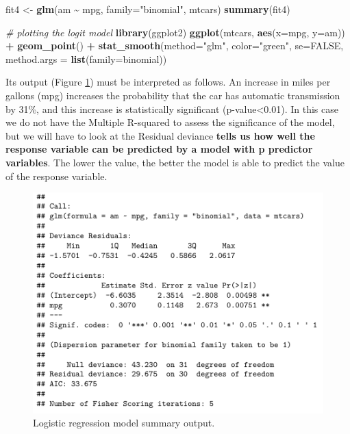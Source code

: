 \documentclass[
]{svmono}
\newenvironment{Shaded}{\begin{snugshade}}{\end{snugshade}}
\newcommand{\AttributeTok}[1]{\textcolor[rgb]{0.13,0.29,0.53}{#1}}
\newcommand{\CommentTok}[1]{\textcolor[rgb]{0.56,0.35,0.01}{\textit{#1}}}
\newcommand{\ConstantTok}[1]{\textcolor[rgb]{0.56,0.35,0.01}{#1}}
\newcommand{\FunctionTok}[1]{\textcolor[rgb]{0.13,0.29,0.53}{\textbf{#1}}}
\newcommand{\NormalTok}[1]{#1}
\newcommand{\OtherTok}[1]{\textcolor[rgb]{0.56,0.35,0.01}{#1}}
\newcommand{\SpecialCharTok}[1]{\textcolor[rgb]{0.81,0.36,0.00}{\textbf{#1}}}
\newcommand{\StringTok}[1]{\textcolor[rgb]{0.31,0.60,0.02}{#1}}
\begin{document}
\begin{Shaded}
\begin{Highlighting}[]
\NormalTok{fit4 }\OtherTok{\textless{}{-}} \FunctionTok{glm}\NormalTok{(am }\SpecialCharTok{\textasciitilde{}}\NormalTok{ mpg, }\AttributeTok{family=}\StringTok{"binomial"}\NormalTok{, mtcars)}
\FunctionTok{summary}\NormalTok{(fit4)}

\CommentTok{\# plotting the logit model}
\FunctionTok{library}\NormalTok{(ggplot2)}
\FunctionTok{ggplot}\NormalTok{(mtcars, }\FunctionTok{aes}\NormalTok{(}\AttributeTok{x=}\NormalTok{mpg, }\AttributeTok{y=}\NormalTok{am)) }\SpecialCharTok{+} 
  \FunctionTok{geom\_point}\NormalTok{() }\SpecialCharTok{+}
  \FunctionTok{stat\_smooth}\NormalTok{(}\AttributeTok{method=}\StringTok{"glm"}\NormalTok{, }\AttributeTok{color=}\StringTok{"green"}\NormalTok{, }\AttributeTok{se=}\ConstantTok{FALSE}\NormalTok{, }
              \AttributeTok{method.args =} \FunctionTok{list}\NormalTok{(}\AttributeTok{family=}\NormalTok{binomial))}
\end{Highlighting}
\end{Shaded}

Its output (Figure \ref{fig:logi}) must be interpreted as follows. An increase in
miles per gallons (mpg) increases the probability that the car has
automatic transmission by 31\%, and this increase is statistically
significant (p-value\textless0.01). In this case we do not have the Multiple
R-squared to assess the significance of the model, but we will have to
look at the Residual deviance \textbf{tells us how well the response variable
can be predicted by a model with p predictor variables}. The lower the
value, the better the model is able to predict the value of the response
variable.

\begin{figure}[H]

{\centering \includegraphics[width=0.5\linewidth,]{images/Schermata 2022-07-07 alle 18.49.38} 

}

\caption{Logistic regression model summary output.}\label{fig:logi}
\end{figure}
\end{document}
